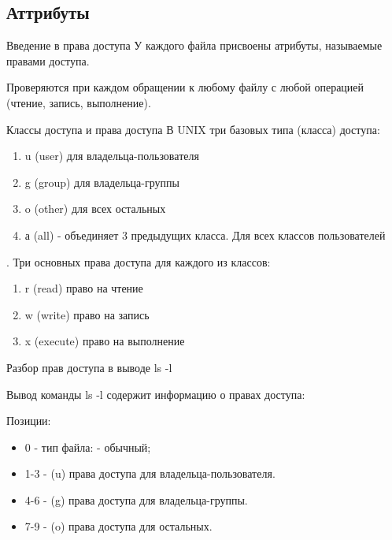 \subsection{Аттрибуты}

\begin{frame}{Введение в права доступа}
  У каждого файла присвоены атрибуты, называемые \alert{правами доступа}.\newline
  
  Проверяются при каждом обращении к любому файлу с любой операцией (чтение, запись, выполнение).\newline \pause

\end{frame}


\begin{frame}{Классы доступа и права доступа}
  В UNIX три базовых типа (класса) доступа:
  \begin{enumerate}
    \item \alert{u} (user) для владельца-пользователя
    \item \alert{g} (group) для владельца-группы         
    \item \alert{o} (other) для всех остальных \pause
    \item \alert{а} (all) - объединяет 3 предыдущих класса. Для всех классов пользователей
  \end{enumerate} \pause 
  .\newline 
  Три основных права доступа для каждого из классов:
  \begin{enumerate}
    \item \alert{r} (read) право на чтение           
    \item \alert{w} (write) право на запись           
    \item \alert{x} (execute) право на выполнение  
  \end{enumerate}

\end{frame}

\begin{frame}[fragile]{Разбор прав доступа в выводе ls -l}

  Вывод команды \alert{ls -l} содержит информацию о правах доступа:

  

  Позиции:
  \begin{itemize}
    \item 0 - тип  файла: - обычный;
    \item 1-3 - (\alert{u}) права доступа для владельца-пользователя.
    \item 4-6 - (\alert{g}) права доступа для владельца-группы.
    \item 7-9 - (\alert{o}) права доступа для остальных.
  \end{itemize}
\end{frame}

